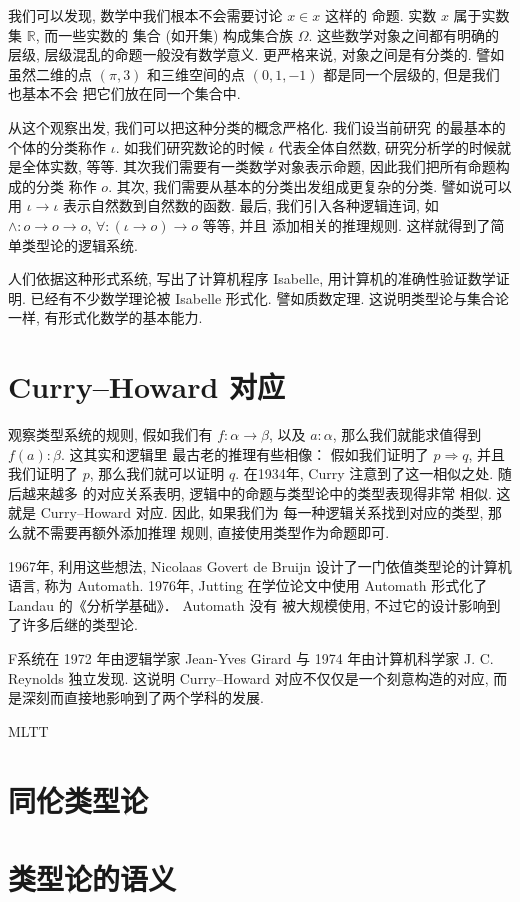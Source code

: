 \documentclass[UTF8, zihao=-4]{ctexart}
\theoremstyle{plain}
\theoremstyle{definition}
\theoremstyle{remark}
\begin{document}
我们可以发现, 数学中我们根本不会需要讨论 \(x \in x\) 这样的
命题. 实数 \(x\) 属于实数集 \(\mathbb R\), 而一些实数的
集合 (如开集) 构成集合族 \(\Omega\). 这些数学对象之间都有明确的层级,
层级混乱的命题一般没有数学意义.
更严格来说, 对象之间是有分类的. 譬如虽然二维的点 \((\pi, 3)\)
和三维空间的点 \((0,1,-1)\) 都是同一个层级的, 但是我们也基本不会
把它们放在同一个集合中.

从这个观察出发, 我们可以把这种分类的概念严格化. 我们设当前研究
的最基本的个体的分类称作 \(\iota\). 如我们研究数论的时候
\(\iota\) 代表全体自然数, 研究分析学的时候就是全体实数, 等等.
其次我们需要有一类数学对象表示命题, 因此我们把所有命题构成的分类
称作 \(o\).
其次, 我们需要从基本的分类出发组成更复杂的分类. 譬如说可以用
\(\iota \to \iota\) 表示自然数到自然数的函数.
最后, 我们引入各种逻辑连词, 如 \(\wedge : o \to o \to o\),
\(\forall : (\iota \to o) \to o\)  等等, 并且
添加相关的推理规则. 这样就得到了简单类型论的逻辑系统.

人们依据这种形式系统, 写出了计算机程序 Isabelle,
用计算机的准确性验证数学证明. 已经有不少数学理论被 Isabelle 形式化.
譬如质数定理. 这说明类型论与集合论一样, 有形式化数学的基本能力.

\section{Curry--Howard 对应}
观察类型系统的规则,
假如我们有 \(f : \alpha \to \beta\), 以及 \(a : \alpha\),
那么我们就能求值得到 \(f(a) : \beta\). 这其实和逻辑里
最古老的推理有些相像： 假如我们证明了 \(p\Rightarrow q\),
并且我们证明了 \(p\), 那么我们就可以证明 \(q\).
在1934年, Curry 注意到了这一相似之处. 随后越来越多
的对应关系表明, 逻辑中的命题与类型论中的类型表现得非常
相似. 这就是 Curry--Howard 对应. 因此, 如果我们为
每一种逻辑关系找到对应的类型, 那么就不需要再额外添加推理
规则, 直接使用类型作为命题即可.

1967年, 利用这些想法, Nicolaas Govert de Bruijn
设计了一门依值类型论的计算机语言, 称为 Automath.
1976年, Jutting 在学位论文中使用 Automath
形式化了 Landau 的《分析学基础》． Automath 没有
被大规模使用, 不过它的设计影响到了许多后继的类型论.

F系统在 1972 年由逻辑学家 Jean-Yves Girard
与 1974 年由计算机科学家 J. C. Reynolds 独立发现.
这说明 Curry--Howard 对应不仅仅是一个刻意构造的对应,
而是深刻而直接地影响到了两个学科的发展.

MLTT

\section{同伦类型论}

\section{类型论的语义}
\end{document}
